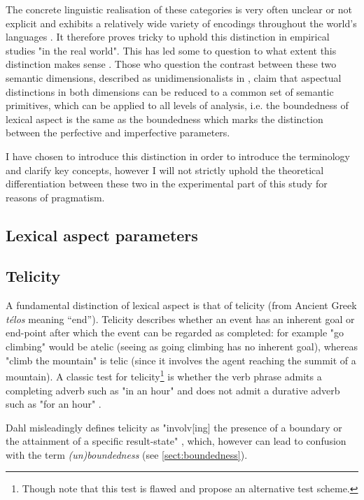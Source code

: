 The concrete linguistic realisation of these categories is very often unclear or not explicit and exhibits a relatively wide variety of encodings throughout the world’s languages \citep{Dahl1985TenseAA}. It therefore proves tricky to uphold this distinction in empirical studies "in the real world". This has led some to question to what extent this distinction makes sense \citep{Sasse2002RecentAI}. Those who question the contrast between these two semantic dimensions, described as unidimensionalists in \citet{Sasse2002RecentAI}, claim that aspectual distinctions in both dimensions can be reduced to a common set of semantic primitives, which can be applied to all levels of analysis, i.e. the boundedness of lexical aspect is the same as the boundedness which marks the distinction between the perfective and imperfective parameters. 

I have chosen to introduce this distinction in order to introduce the terminology and clarify key concepts, however I will not strictly uphold the theoretical differentiation between these two in the experimental part of this study for reasons of pragmatism.

\subsection{Lexical aspect parameters}
\subsection*{Telicity}
A fundamental distinction of lexical aspect is that of telicity (from Ancient Greek \emph{télos} meaning “end”). Telicity describes whether an event has an inherent goal or end-point after which the event can be regarded as completed: for example "go climbing" would be atelic (seeing as going climbing has no inherent goal), whereas "climb the mountain" is telic (since it involves the agent reaching the summit of a mountain). A classic test for telicity\footnote{Though \citet{XiaoMcenery+2006+1+21} note that this test is flawed and propose an alternative test scheme.} is whether the verb phrase admits a completing adverb such as "in an hour" and does not admit a durative adverb such as "for an hour" \citep{Krifka1998TheOO}.

Dahl misleadingly defines telicity as "involv[ing] the presence of a boundary or the attainment of a specific result-state" \citep{DAHL2015210}, which, however can lead to confusion with the term \emph{(un)boundedness} (see \ref{sect:boundedness}).

